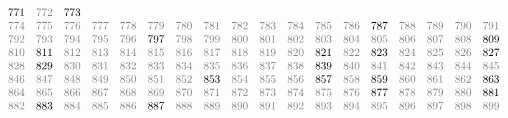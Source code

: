 \documentclass[10pt]{article}
\theoremstyle{definition}
\begin{document}
\begin{figure}[h!]
\[\begin{array}{cccccccccccccccccc}
{771}&\textcolor{gray}{772}&773\\\textcolor{gray}{774}&\textcolor{gray}{775}&\textcolor{gray}{776}&\textcolor{gray}{777}&\textcolor{gray}{778}&\textcolor{gray}{779}&\textcolor{gray}{780}&\textcolor{gray}{781}&\textcolor{gray}{782}&\textcolor{gray}{783}&\textcolor{gray}{784}&\textcolor{gray}{785}&\textcolor{gray}{786}&787&\textcolor{gray}{788}&\textcolor{gray}{789}&\textcolor{gray}{790}&\textcolor{gray}{791}\\\textcolor{gray}{792}&\textcolor{gray}{793}&\textcolor{gray}{794}&\textcolor{gray}{795}&\textcolor{gray}{796}&797&\textcolor{gray}{798}&\textcolor{gray}{799}&\textcolor{gray}{800}&\textcolor{gray}{801}&\textcolor{gray}{802}&\textcolor{gray}{803}&\textcolor{gray}{804}&\textcolor{gray}{805}&\textcolor{gray}{806}&\textcolor{gray}{807}&\textcolor{gray}{808}&809\\\textcolor{gray}{810}&811&\textcolor{gray}{812}&\textcolor{gray}{813}&\textcolor{gray}{814}&\textcolor{gray}{815}&\textcolor{gray}{816}&\textcolor{gray}{817}&\textcolor{gray}{818}&\textcolor{gray}{819}&\textcolor{gray}{820}&821&\textcolor{gray}{822}&823&\textcolor{gray}{824}&\textcolor{gray}{825}&\textcolor{gray}{826}&827\\\textcolor{gray}{828}&829&\textcolor{gray}{830}&\textcolor{gray}{831}&\textcolor{gray}{832}&\textcolor{gray}{833}&\textcolor{gray}{834}&\textcolor{gray}{835}&\textcolor{gray}{836}&\textcolor{gray}{837}&\textcolor{gray}{838}&839&\textcolor{gray}{840}&\textcolor{gray}{841}&\textcolor{gray}{842}&\textcolor{gray}{843}&\textcolor{gray}{844}&\textcolor{gray}{845}\\\textcolor{gray}{846}&\textcolor{gray}{847}&\textcolor{gray}{848}&\textcolor{gray}{849}&\textcolor{gray}{850}&\textcolor{gray}{851}&\textcolor{gray}{852}&853&\textcolor{gray}{854}&\textcolor{gray}{855}&\textcolor{gray}{856}&857&\textcolor{gray}{858}&859&\textcolor{gray}{860}&\textcolor{gray}{861}&\textcolor{gray}{862}&863\\\textcolor{gray}{864}&\textcolor{gray}{865}&\textcolor{gray}{866}&\textcolor{gray}{867}&\textcolor{gray}{868}&\textcolor{gray}{869}&\textcolor{gray}{870}&\textcolor{gray}{871}&\textcolor{gray}{872}&\textcolor{gray}{873}&\textcolor{gray}{874}&\textcolor{gray}{875}&\textcolor{gray}{876}&877&\textcolor{gray}{878}&\textcolor{gray}{879}&\textcolor{gray}{880}&881\\\textcolor{gray}{882}&883&\textcolor{gray}{884}&\textcolor{gray}{885}&\textcolor{gray}{886}&887&\textcolor{gray}{888}&\textcolor{gray}{889}&\textcolor{gray}{890}&\textcolor{gray}{891}&\textcolor{gray}{892}&\textcolor{gray}{893}&\textcolor{gray}{894}&\textcolor{gray}{895}&\textcolor{gray}{896}&\textcolor{gray}{897}&\textcolor{gray}{898}&\textcolor{gray}{899}
\end{array}
\]
\end{figure}
\clearpage
\end{document}
